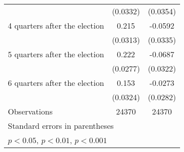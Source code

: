 \begin{table}[htbp]
\begin{tabular}{l*{2}{c}}
                    &    (0.0332)         &    (0.0354)         \\
[1em]
 4 quarters after the election&       0.215\sym{***}&     -0.0592         \\
                    &    (0.0313)         &    (0.0335)         \\
[1em]
 5 quarters after the election&       0.222\sym{***}&     -0.0687\sym{*}  \\
                    &    (0.0277)         &    (0.0322)         \\
[1em]
 6 quarters after the election&       0.153\sym{***}&     -0.0273         \\
                    &    (0.0324)         &    (0.0282)         \\
\hline
Observations        &       24370         &       24370         \\
\hline\hline
\multicolumn{3}{l}{\footnotesize Standard errors in parentheses}\\
\multicolumn{3}{l}{\footnotesize \sym{*} \(p<0.05\), \sym{**} \(p<0.01\), \sym{***} \(p<0.001\)}\\
\end{tabular}
\end{table}
